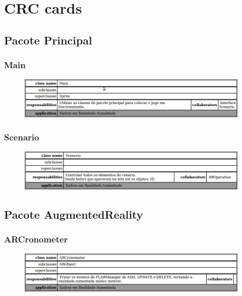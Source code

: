 \documentclass[a4paper,12pt]{book}
\begin{document}
  \chapter{CRC cards}
  \label{ch:crccards}
  \section{Pacote Principal}
	\label{sec:crcpacoteprincipal}
    \subsection{Main}
    \label{subsec:crcmain}
    \begin{figure}[H]
	  \centering
	  \includegraphics[width=1.0\textwidth]{crc/Main}
	  \end{figure}
  	\subsection{Scenario}
    \label{subsec:crcscenario}
    \begin{figure}[H]
	  \centering
	  \includegraphics[width=1.0\textwidth]{crc/Scenario}
	  \end{figure}
  \section{Pacote AugmentedReality}
  \label{sec:crcpacoteaugmentedreality}
    \subsection{ARCronometer}
    \label{subsec:crcarcronometer}
    \begin{figure}[H]
	  \centering
	  \includegraphics[width=1.0\textwidth]{crc/ARCronometer}
	  \end{figure}
\end{document}
